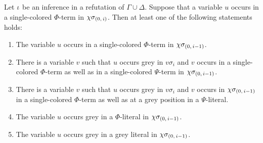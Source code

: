 \documentclass[,%
	draft=false,%
	numbers=noendperiod
	12pt,
	a4paper,
	oneside,%
	openany,
]{memoir}
\newcommand{\inv}{\ensuremath{\chi}}
\begin{document}
\begin{lemma}
	\label{lemma:var_in_sc_term}
	Let $\iota$ be an inference in a refutation of $\Gamma\cup\Delta$.
	Suppose that a variable $u$ occurs in a single-colored $\Phi$-term in $\inv\sigmazi$.
	Then at least one of the following statements holds:
	\begin{enumerate}
		\item
			\label{15_1}
			The variable $u$ occurs in a single-colored $\Phi$-term in $\inv\sigmazmi$.

		\item
			\label{15_2}
			There is a variable $v$ such that $u$ occurs grey in $v\sigma_i$ and $v$ occurs in a single-colored $\Phi$-term as well as in a single-colored $\Psi$-term in $\inv\sigmazmi$.

		\item
			\label{15_4}
			There is a variable $v$ such that $u$ occurs grey in $v\sigma_i$ and $v$ occurs in $\inv\sigmazmi$ in a single-colored $\Phi$-term as well as at a grey position in a $\Psi$-literal.

		\item
			\label{15_3}
			The variable $u$ occurs grey in a $\Phi$-literal in $\inv\sigmazmi$.

		\item
			\label{15_5}
			The variable $u$ occurs grey in a grey literal in $\inv\sigmazmi$.

	\end{enumerate}
\end{lemma}
\end{document}
